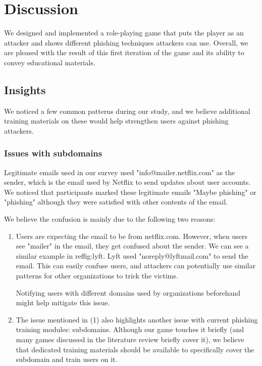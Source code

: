 



\chapter{Discussion}
We designed and implemented a role-playing game that puts the player as an attacker and shows different phishing techniques attackers can use.  Overall, we are pleased with the result of this first iteration of the game and its ability to convey educational materials.

\section{Insights}
We noticed a few common patterns during our study, and we believe additional training materials on these would help strengthen users against phishing attackers.

\subsection{Issues with subdomains}
Legitimate emails used in our survey used "info@mailer.netflix.com" as the sender, which is the email used by Netflix to send updates about user accounts. We noticed that participants marked these legitimate emails "Maybe phishing" or "phishing" although they were satisfied with other contents of the email.

We believe the confusion is mainly due to the following two reasons:

\begin{enumerate}
    \item Users are expecting the email to be from netflix.com. However, when users see "mailer" in the email, they get confused about the sender. We can see a similar example in ref{fig:lyft}. Lyft used "noreply@lyftmail.com" to send the email. This can easily confuse users, and attackers can potentially use similar patterns for other organizations to trick the victims.

    Notifying users with different domains used by organizations beforehand might help mitigate this issue.

    \item The issue mentioned in (1) also highlights another issue with current phishing training modules: subdomains. Although our game touches it briefly (and many games discussed in the literature review briefly cover it), we believe that dedicated training materials should be available to specifically cover the subdomain and train users on it.

\end{enumerate}

